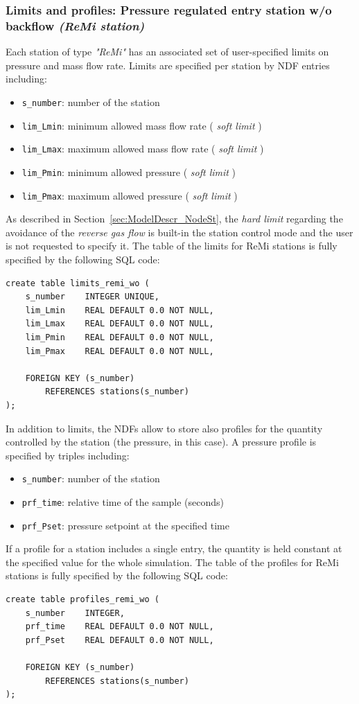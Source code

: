 \subsubsection{Limits and profiles: Pressure regulated entry station w/o backflow \textit{(ReMi station)}}
Each station of type \textit{"ReMi"} has an associated set of user-specified limits on pressure
and mass flow rate. Limits are specified per station by NDF entries including:
\begin{itemize}
    \item \texttt{s\_number}:   number of the station
    \item \texttt{lim\_Lmin}:   minimum allowed mass flow rate ( \textit{soft limit} )
    \item \texttt{lim\_Lmax}:   maximum allowed mass flow rate ( \textit{soft limit} )
    \item \texttt{lim\_Pmin}:   minimum allowed pressure ( \textit{soft limit} )
    \item \texttt{lim\_Pmax}:   maximum allowed pressure ( \textit{soft limit} )
\end{itemize}
As described in Section~\ref{sec:ModelDescr_NodeSt}, the \textit{hard limit} regarding the avoidance of the \textit{reverse gas flow} is built-in the station control mode and the user is not requested to specify it. 
The table of the limits for ReMi stations is fully specified by the following SQL code:
\begin{verbatim}
create table limits_remi_wo (
    s_number    INTEGER UNIQUE,
    lim_Lmin    REAL DEFAULT 0.0 NOT NULL,
    lim_Lmax    REAL DEFAULT 0.0 NOT NULL,
    lim_Pmin    REAL DEFAULT 0.0 NOT NULL,
    lim_Pmax    REAL DEFAULT 0.0 NOT NULL,

    FOREIGN KEY (s_number)
        REFERENCES stations(s_number)
);
\end{verbatim}
In addition to limits, the NDFs allow to store also profiles for the quantity
controlled by the station (the pressure, in this case). 
A pressure profile is specified by triples including:
\begin{itemize}
    \item \texttt{s\_number}:   number of the station
    \item \texttt{prf\_time}:   relative time of the sample (seconds)
    \item \texttt{prf\_Pset}:   pressure setpoint at the specified time
\end{itemize}
If a profile for a station includes a single entry, the quantity is held constant
at the specified value for the whole simulation. The table of the profiles for
ReMi stations is fully specified by the following SQL code:
\begin{verbatim}
create table profiles_remi_wo (
    s_number    INTEGER,
    prf_time    REAL DEFAULT 0.0 NOT NULL,
    prf_Pset    REAL DEFAULT 0.0 NOT NULL,

    FOREIGN KEY (s_number)
        REFERENCES stations(s_number)
);
\end{verbatim}

